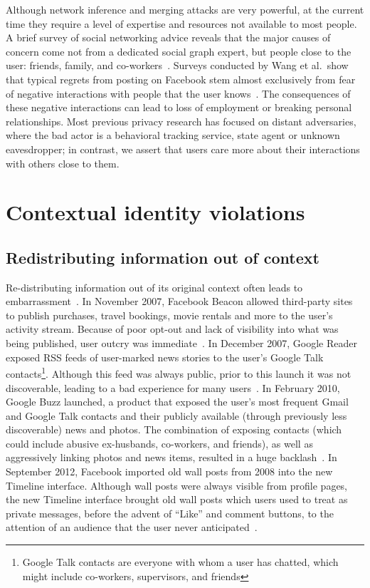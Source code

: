 \documentclass[10pt, conference, compsocconf]{IEEEtran}
\begin{document}
\begin{comment}TODO: figure out how to cite this. Why is this short
paper's model worth pursuing? It's simpler, and focuses on the user rather
than data.
\end{comment}

Although network inference and merging attacks are very powerful, at the
current time they require a level of expertise and resources not available to
most people. A brief survey of social networking
advice reveals that the
major causes of concern come not from a dedicated social graph expert, but people
close to the user: friends, family, and co-workers~\cite{fbtips2,fbtips1}.
Surveys conducted by Wang et al.~show that typical regrets from posting on
Facebook stem almost exclusively from fear of negative interactions with people
that the user knows~\cite{wang}. The consequences of these negative
interactions can lead to loss of employment or breaking personal relationships.
Most previous privacy research has focused on distant adversaries, where the
bad actor is a behavioral tracking service, state agent or unknown
eavesdropper; in contrast, we assert that users care more about their
interactions with others close to them.

\section{Contextual identity violations}
\label{sec:examples}
\subsection{Redistributing information out of context}
Re-distributing information out of its original context often leads to
embarrassment~\cite{nissenbaum}.  In November 2007, Facebook Beacon allowed
third-party sites to publish purchases, travel bookings, movie rentals and more to the
user's activity stream.  Because of poor opt-out and lack of visibility into
what was being published, user outcry was immediate~\cite{mccarthy,nakashima}.
In December 2007, Google Reader exposed RSS feeds of user-marked news stories
to the user's Google Talk contacts\footnote{Google Talk contacts are everyone
with whom a user has chatted, which might include co-workers, supervisors, and
friends}. Although this feed was always public, prior to this launch it was not
discoverable, leading to a bad experience for many users~\cite{helft}. In
February 2010, Google Buzz launched, a product that
exposed the user's most frequent Gmail and Google Talk contacts and their
publicly available (through previously less discoverable) news and photos.  The
combination of exposing contacts (which could include abusive ex-husbands,
co-workers, and friends), as well as aggressively linking photos and news
items, resulted in a huge backlash~\cite{fugitivus,buzz}. In September 2012,
Facebook imported old wall posts from 2008 into the new Timeline interface.
Although wall posts were always visible from profile pages, the new Timeline
interface brought old wall posts which users used to treat as private
messages, before the advent of ``Like'' and comment buttons, to the attention
of an audience that the user never anticipated~\cite{timeline}.
\end{document}
